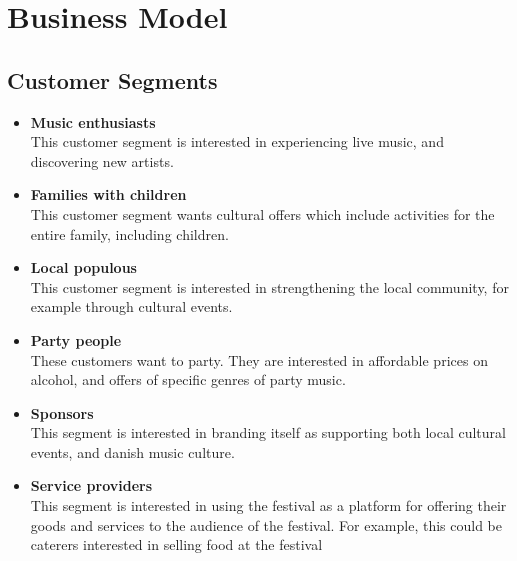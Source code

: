 \section{Business Model} %
\label{sec:business_model}
\subsection{Customer Segments} %
\label{sub:customer_segments}
\begin{itemize}
	\item \textbf{Music enthusiasts}\\
			This customer segment is interested in experiencing live music, and discovering new artists.
	\item \textbf{Families with children}\\
			This customer segment wants cultural offers which include activities for the entire family, including children.
	\item \textbf{Local populous}\\
			This customer segment is interested in strengthening the local community, for example through cultural events. 
	\item \textbf{Party people}\\
			These customers want to party. They are interested in affordable prices on alcohol, and offers of specific genres of party music.
	\item \textbf{Sponsors}\\
			This segment is interested in branding itself as supporting both local cultural events, and danish music culture.
	\item \textbf{Service providers}\\
		This segment is interested in using the festival as a platform for offering their goods and services to the audience of the festival. For example, this could be caterers interested in selling food at the festival
\end{itemize}
